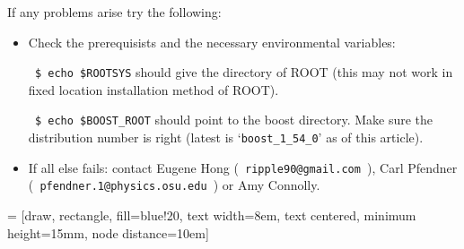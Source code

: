 \documentclass[a4paper,10pt]{article}
\begin{document}
If any problems arise try the following:

\begin{itemize}

 \item Check the prerequisists and the necessary environmental variables:
 
 \verb| $ echo $ROOTSYS| should give the directory of ROOT (this may not work in fixed location installation method of ROOT). 
 
 \verb| $ echo $BOOST_ROOT| should point to the boost directory. Make sure the distribution number is right (latest is `\verb|boost_1_54_0|' as of this article). 
 
%  
%  
%  
%  
%  
 
 \item If all else fails: contact Eugene Hong (\verb| ripple90@gmail.com |), Carl Pfendner\\ (\verb| pfendner.1@physics.osu.edu |) or Amy Connolly. 
 
\end{itemize}

\pagebreak


 = [draw, rectangle, fill=blue!20, text width=8em, text centered, minimum height=15mm, node distance=10em]
\end{document}
